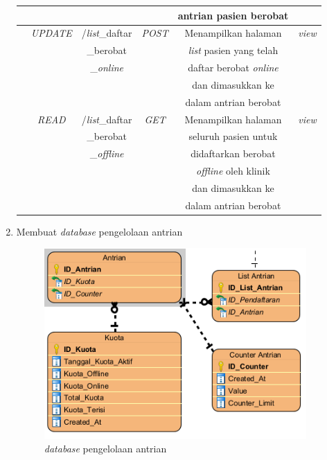 \begin{enumerate}
\begin{table}[H]
\begin{tabular}{|c|c|c|c|c|c|}
			& 
			&
			&
			&
			antrian pasien berobat&\\
			\hline
			
			& 
			\emph{UPDATE}&
			/\emph{list}\_daftar&
			\emph{POST}&
			Menampilkan halaman &
			\emph{view}\\
			
			
			& 
			&
			\_berobat&
			&
			\emph{list} pasien yang telah &\\
			
			& 
			&
			\_\emph{online}&
			&
			daftar berobat \emph{online}&\\
			
			& 
			&
			&
			&
			dan dimasukkan ke &\\
			
			& 
			&
			&
			&
			dalam antrian berobat &\\
			\hline
			
			& 
			\emph{READ} &
			/\emph{list}\_daftar &
			\emph{GET} &
			Menampilkan halaman&
			\emph{view}\\
			
			& 
			&
			\_berobat&
			&
			seluruh pasien untuk&\\
			
			& 
			&
			\_\emph{offline}&
			&
			didaftarkan berobat&\\
			
			& 
			&
			&
			&
			\emph{offline} oleh klinik &\\
			
			& 
			&
			&
			&
			dan dimasukkan ke &\\
			
			& 
			&
			&
			&
			dalam antrian berobat &\\
			\hline
			
		\end{tabular}
	\end{table}

	\break
	\item Membuat \emph{database} pengelolaan antrian
	
	\begin{figure}[H]
		\centering
		\includegraphics[width=10cm]{gambar/antrian_database.png}
		\caption{\emph{database} pengelolaan antrian}
		\label{Gambar:pengelolaanantrian2}
	\end{figure}
	

\end{enumerate}
